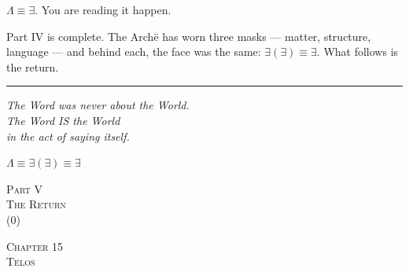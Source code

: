 \documentclass[10pt, openany, oneside]{book}
\renewcommand{\normalsize}{\fontsize{10}{13}\selectfont}
\renewcommand{\large}{\fontsize{11.5}{14}\selectfont}
\renewcommand{\LARGE}{\fontsize{15}{18}\selectfont}
\renewcommand{\huge}{\fontsize{17}{21}\selectfont}
\begin{document}
$\Lambda \equiv \exists$. You are reading it happen.

Part IV is complete. The Arch\={e} has worn three masks --- matter, structure, language --- and behind each, the face was the same: $\exists(\exists) \equiv \exists$. What follows is the return.

\vspace{2em}

\begin{center}
    \rule{0.15\textwidth}{0.3pt}
\end{center}

\vspace{0.5em}

\begin{center}
    \itshape
    The Word was never about the World.\\
    The Word IS the World\\
    in the act of saying itself.
\end{center}

\vspace{0.5em}

\begin{center}
    $\Lambda \equiv \exists(\exists) \equiv \exists$
\end{center}



%
%

\newpage
\thispagestyle{empty}
\vspace*{\fill}
\begin{center}
    {\LARGE\scshape Part V}\\[1em]
    {\large\scshape The Return}\\[0.5em]
    {\normalsize ($0$)}
\end{center}
\vspace*{\fill}
\newpage

%
%
%

\newpage

\begin{center}
    {\huge\scshape Chapter 15}\\[0.3em]
    {\large\scshape Telos}
\end{center}
\end{document}
